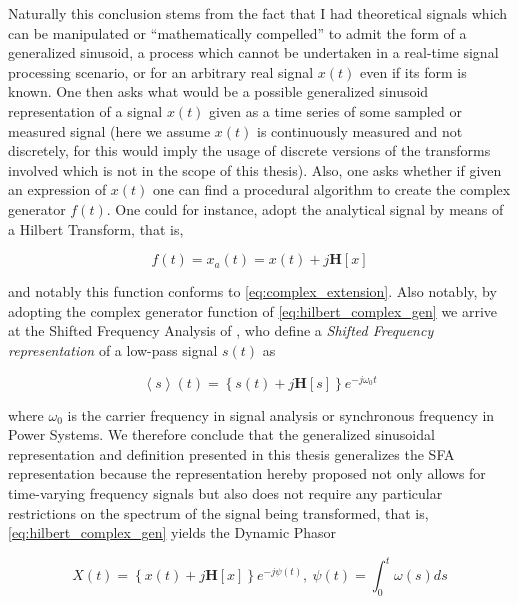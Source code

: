	Naturally this conclusion stems from the fact that I had theoretical signals which can be manipulated or ``mathematically compelled'' to admit the form of a generalized sinusoid, a process which cannot be undertaken in a real-time signal processing scenario, or for an arbitrary real signal $x(t)$ even if its form is known. One then asks what would be a possible generalized sinusoid representation of a signal $x(t)$ given as a time series of some sampled or measured signal (here we assume $x(t)$ is continuously measured and not discretely, for this would imply the usage of discrete versions of the transforms involved which is not in the scope of this thesis). Also, one asks whether if given an expression of $x(t)$ one can find a procedural algorithm to create the complex generator $f(t)$. One could for instance, adopt the analytical signal by means of a Hilbert Transform, that is,

\begin{equation} f(t) = x_a(t) = x(t) + j\mathbf{H}\left[x\right]\label{eq:hilbert_complex_gen}\end{equation}

	\noindent and notably this function conforms to \eqref{eq:complex_extension}. Also notably, by adopting the complex generator function of \eqref{eq:hilbert_complex_gen} we arrive at the Shifted Frequency Analysis of \cite{zhangSynchronousMachineModeling2007}, who define a \textit{Shifted Frequency representation} of a low-pass signal $s(t)$ as

\begin{equation} \left<s\right>(t) = \left\{s(t) + j\mathbf{H}\left[s\right]\right\}e^{-j\omega_0 t} \end{equation}

	\noindent where $\omega_0$ is the carrier frequency in signal analysis or synchronous frequency in Power Systems. We therefore conclude that the generalized sinusoidal representation and definition presented in this thesis generalizes the SFA representation because the representation hereby proposed not only allows for time-varying frequency signals but also does not require any particular restrictions on the spectrum of the signal being transformed, that is, \eqref{eq:hilbert_complex_gen} yields the Dynamic Phasor

\begin{equation} X(t) = \left\{x(t) + j\mathbf{H}\left[x\right]\right\}e^{-j\psi(t)},\ \psi(t) = \int_0^t \omega(s)ds \label{eq:hilbert_complex_gen_phasor}\end{equation}

